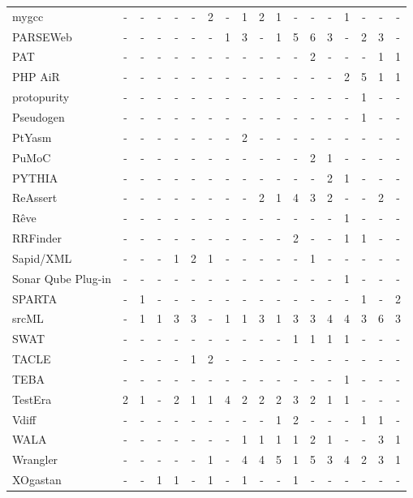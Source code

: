 \begin{longtable}{ l *{17}{c} }
    mygcc & - & - & - & - & - & 2 & - & 1 & 2 & 1 & - & - & - & 1 & - & - & - \\
    PARSEWeb & - & - & - & - & - & - & 1 & 3 & - & 1 & 5 & 6 & 3 & - & 2 & 3 & - \\
    PAT & - & - & - & - & - & - & - & - & - & - & - & 2 & - & - & - & 1 & 1 \\
    PHP AiR & - & - & - & - & - & - & - & - & - & - & - & - & - & 2 & 5 & 1 & 1 \\
    protopurity & - & - & - & - & - & - & - & - & - & - & - & - & - & - & 1 & - & - \\
    Pseudogen & - & - & - & - & - & - & - & - & - & - & - & - & - & - & 1 & - & - \\
    PtYasm & - & - & - & - & - & - & - & 2 & - & - & - & - & - & - & - & - & - \\
    PuMoC & - & - & - & - & - & - & - & - & - & - & - & 2 & 1 & - & - & - & - \\
    PYTHIA & - & - & - & - & - & - & - & - & - & - & - & - & 2 & 1 & - & - & - \\
    ReAssert & - & - & - & - & - & - & - & - & 2 & 1 & 4 & 3 & 2 & - & - & 2 & - \\
    Rêve & - & - & - & - & - & - & - & - & - & - & - & - & - & 1 & - & - & - \\
    RRFinder & - & - & - & - & - & - & - & - & - & - & 2 & - & - & 1 & 1 & - & - \\
    Sapid/XML & - & - & - & 1 & 2 & 1 & - & - & - & - & - & 1 & - & - & - & - & - \\
    Sonar Qube Plug-in & - & - & - & - & - & - & - & - & - & - & - & - & - & 1 & - & - & - \\
    SPARTA & - & 1 & - & - & - & - & - & - & - & - & - & - & - & - & 1 & - & 2 \\
    srcML & - & 1 & 1 & 3 & 3 & - & 1 & 1 & 3 & 1 & 3 & 3 & 4 & 4 & 3 & 6 & 3 \\
    SWAT & - & - & - & - & - & - & - & - & - & - & 1 & 1 & 1 & 1 & - & - & - \\
    TACLE & - & - & - & - & 1 & 2 & - & - & - & - & - & - & - & - & - & - & - \\
    TEBA & - & - & - & - & - & - & - & - & - & - & - & - & - & 1 & - & - & - \\
    TestEra & 2 & 1 & - & 2 & 1 & 1 & 4 & 2 & 2 & 2 & 3 & 2 & 1 & 1 & - & - & - \\
    Vdiff & - & - & - & - & - & - & - & - & - & 1 & 2 & - & - & - & 1 & 1 & - \\
    WALA & - & - & - & - & - & - & - & 1 & 1 & 1 & 1 & 2 & 1 & - & - & 3 & 1 \\
    Wrangler & - & - & - & - & - & 1 & - & 4 & 4 & 5 & 1 & 5 & 3 & 4 & 2 & 3 & 1 \\
    XOgastan & - & - & 1 & 1 & - & 1 & - & 1 & - & - & 1 & - & - & - & - & - & - \\
  \hline
\end{longtable}

